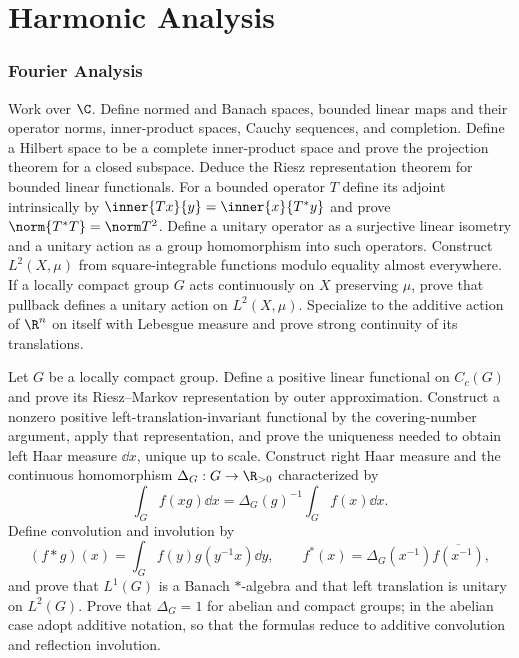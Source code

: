 \part{Harmonic Analysis}

\section{Fourier Analysis}

\begin{exercise}
Work over $\C$.  Define normed and Banach spaces, bounded linear maps and
their operator norms, inner-product spaces, Cauchy sequences, and completion.
Define a Hilbert space to be a complete inner-product space and prove the
projection theorem for a closed subspace.  Deduce the Riesz representation
theorem for bounded linear functionals.  For a bounded operator $T$ define
its adjoint intrinsically by
$\inner{Tx}{y}=\inner{x}{T^*y}$ and prove
$\norm{T^*T}=\norm T^2$.  Define a unitary operator as a surjective linear
isometry and a unitary action as a group homomorphism into such operators.
Construct $L^2(X,\mu)$ from square-integrable functions modulo equality
almost everywhere.  If a locally compact group $G$ acts continuously on $X$
preserving $\mu$, prove that pullback defines a unitary action on
$L^2(X,\mu)$.  Specialize to the additive action of $\R^n$ on itself with
Lebesgue measure and prove strong continuity of its translations.
\end{exercise}

\begin{exercise}
Let $G$ be a locally compact group.  Define a positive linear functional on
$C_c(G)$ and prove its Riesz--Markov representation by outer approximation.
Construct a
nonzero positive left-translation-invariant functional by the covering-number
argument, apply that representation, and prove the uniqueness needed to
obtain left Haar measure $\dd x$, unique up to scale.  Construct right Haar measure and
the continuous homomorphism $\Delta_G:G\to\R_{>0}$ characterized by
\[
 \int_G f(xg)\dd x=\Delta_G(g)^{-1}\int_Gf(x)\dd x.
\]
Define convolution and involution by
\[
 (f*g)(x)=\int_G f(y)g(y^{-1}x)\dd y,
 \qquad f^*(x)=\Delta_G(x^{-1})\overline{f(x^{-1})},
\]
and prove that $L^1(G)$ is a Banach $*$-algebra and that left translation is
unitary on $L^2(G)$.  Prove that $\Delta_G=1$ for abelian and compact groups;
in the abelian case adopt additive notation, so that the formulas reduce to
additive convolution and reflection involution.
\end{exercise}

